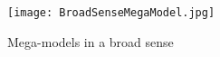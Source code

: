 \begin{figure}
\centering
\texttt{[image: BroadSenseMegaModel.jpg]}
\caption{Mega-models in a broad sense}
\label{fig:BoradSenseMegaModel}
\end{figure}